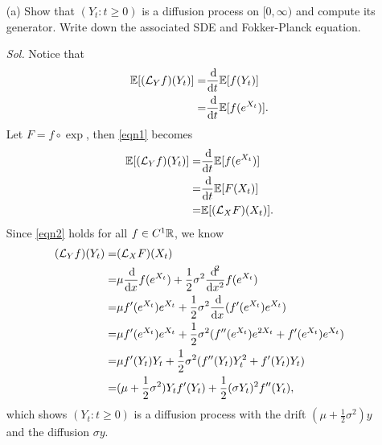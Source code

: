 \begin{enumerate}
    \item[(a)] Show that $(Y_t: t \ge 0)$ is a diffusion process on $[0, \infty)$ and compute its generator. Write down the associated SDE and Fokker-Planck equation.

        \textit{ Sol. } Notice that 
        \begin{align}
            \E[(\mathcal{L}_Yf)(Y_t)] = & \frac{\dif}{\dif t} \E [f(Y_t)] \notag \\ 
            = & \frac{\dif}{\dif t} \E [f(e^{X_t})]. \label{eqn1}
        \end{align}
        Let $F = f \circ \exp$, then \eqref{eqn1} becomes
        \begin{align}
            \E[(\mathcal{L}_Yf)(Y_t)] = & \frac{\dif}{\dif t} \mbb{E} [f(e^{X_t})]  \notag \\ 
            = & \frac{\dif}{\dif t} \mbb{E} [F(X_t)] \notag \\ 
            = & \mbb{E} [(\mathcal{L}_X F)(X_t)]. \label{eqn2}
        \end{align}
        Since \eqref{eqn2} holds for all $f \in C^1{\mathbb{R}}$, we know 
        \begin{align*}
            (\mathcal{L}_Yf)(Y_t) = & (\mathcal{L}_X F)(X_t) \\ 
            = & \mu \frac{\dif}{\dif x} f(e^{X_t}) + \frac{1}{2} \sigma^2 \frac{\dif ^2}{\dif x^2} f(e^{X_t}) \\ 
            = & \mu f'(e^{X_t}) e^{X_t} + \frac{1}{2} \sigma^2 \frac{\dif}{\dif x} ( f'(e^{X_t})e^{X_t}) \\ 
            = & \mu f'(e^{X_t}) e^{X_t} + \frac{1}{2} \sigma^2 (f''(e^{X_t})e^{2X_t} + f'(e^{X_t}) e^{X_t}) \\ 
            = & \mu f'(Y_t) Y_t + \frac{1}{2}\sigma^2 (f''(Y_t) Y_t^2 + f'(Y_t) Y_t) \\ 
            = & (\mu + \frac{1}{2} \sigma^2)Y_t f'(Y_t) + \frac{1}{2} (\sigma Y_t)^2 f''(Y_t),
        \end{align*}
        which shows $(Y_t: t \ge 0)$ is a diffusion process with the drift $(\mu + \frac{1}{2}\sigma^2) y$ and the diffusion $\sigma y$.


\end{enumerate}

